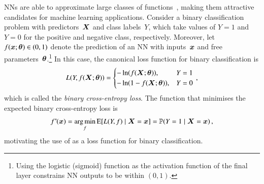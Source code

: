 NNs are able to approximate large classes of
functions~\cite{cybenko1989approximation,hornik1989multilayer}, making them
attractive candidates for machine learning applications.
Consider a binary classification problem with predictors~$\bm{X}$ and class
labels~$Y$, which take values of $Y = 1$ and $Y = 0$ for the positive and
negative class, respectively. Moreover,
let~$f(\bm{x}; \bm{\theta}) \in (0, 1)$ denote the prediction of an NN
with inputs~$\bm{x}$ and free parameters~$\bm{\theta}$.\footnote{Using the
  logistic (sigmoid) function as the activation function of the final layer
  constrains NN outputs to be within $(0, 1)$.} In this case, the canonical loss
function for binary classification is
\begin{align}
  L(Y, f(\bm{X}; \bm{\theta})) =
  \begin{cases}
    -\ln\mathopen{}\left( f(\bm{X}; \bm{\theta}) \right)\mathclose{},       & Y = 1 \\
    -\ln\mathopen{}\left( 1 - f(\bm{X}; \bm{\theta}) \right)\mathclose{},   & Y = 0 \\
  \end{cases} \,\text{,}
  \label{eq:loss_bce}
\end{align}
which is called the \emph{binary cross-entropy loss}. The function that
minimises the expected binary cross-entropy loss is
\begin{align*}
  f^{*\!}(\bm{x})
  = \operatorname*{arg\,min}_{f} \operatorname{E}[ L(Y, f) \mid \bm{X} = \bm{x} ]
  = \mathbb{P}(Y = 1 \mid \bm{X} = \bm{x}) \,\text{,}
\end{align*}
motivating the use of  as a loss function for binary
classification.
%

